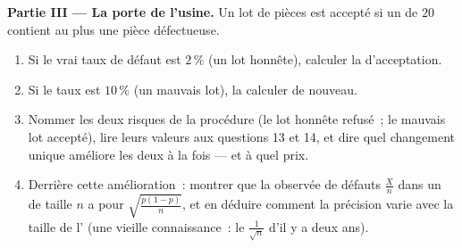 \begin{problem}
\medskip
\noindent\textbf{Partie III --- La porte de l'usine.}
Un lot de pièces est accepté si un  de $20$ contient au
plus une pièce défectueuse.
\begin{enumerate}[resume]
  \item Si le vrai taux de défaut est $2\,\%$ (un lot honnête),
        calculer la  d'acceptation.
  \item Si le taux est $10\,\%$ (un mauvais lot), la calculer de
        nouveau.
  \item Nommer les deux risques de la procédure (le lot honnête
        refusé~; le mauvais lot accepté), lire leurs valeurs aux
        questions 13 et 14, et dire quel changement unique améliore
        les deux à la fois --- et à quel prix.
  \item Derrière cette amélioration~: montrer que la
        \emph{} observée de défauts $\frac Xn$ dans un
         de taille $n$ a pour 
        $\sqrt{\frac{p(1-p)}{n}}$, et en déduire comment la
        précision varie avec la taille de l' (une vieille
        connaissance~: le $\frac{1}{\sqrt n}$ d'il y a deux ans).
\end{enumerate}


\end{problem}
